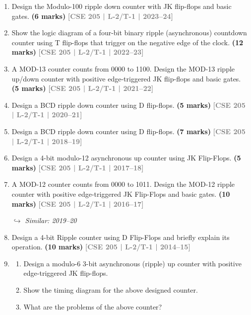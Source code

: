\documentclass[12pt,a3paper]{article}
\newcommand{\yr}[1]{\hfill\textcolor{gray}{\small\textbf{[#1]}}}
\newcommand{\mk}[1]{\textcolor{orange!70!black}{\small\textbf{(#1 marks)}}}
\newcommand{\variant}[1]{\par\vspace{1pt}\textcolor{blue!50!black}%
  {\footnotesize\textit{$\hookrightarrow$ Similar: #1}}}
\begin{document}
\begin{enumerate}

\item Design the Modulo-100 ripple down counter with JK flip-flops and basic gates.
\mk{6} \yr{CSE 205 | L-2/T-1 | 2023--24}

\item Show the logic diagram of a four-bit binary ripple (asynchronous) countdown counter using T flip-flops that trigger on the negative edge of the clock.
\mk{12} \yr{CSE 205 | L-2/T-1 | 2022--23}

\item A MOD-13 counter counts from 0000 to 1100. Design the MOD-13 ripple up/down counter with positive edge-triggered JK flip-flops and basic gates.
\mk{5} \yr{CSE 205 | L-2/T-1 | 2021--22}

\item Design a BCD ripple down counter using D flip-flops.
\mk{5} \yr{CSE 205 | L-2/T-1 | 2020--21}

\item Design a BCD ripple down counter using D flip-flops.
\mk{7} \yr{CSE 205 | L-2/T-1 | 2018--19}

\item Design a 4-bit modulo-12 asynchronous up counter using JK Flip-Flops.
\mk{5} \yr{CSE 205 | L-2/T-1 | 2017--18}


\item A MOD-12 counter counts from 0000 to 1011. Design the MOD-12 ripple counter with positive edge-triggered JK Flip-Flops and basic gates.
\mk{10} \yr{CSE 205 | L-2/T-1 | 2016--17}
\variant{2019--20}

\item Design a 4-bit Ripple counter using D Flip-Flops and briefly explain its operation.
\mk{10} \yr{CSE 205 | L-2/T-1 | 2014--15}


\item
\begin{enumerate}
  \item Design a modulo-6 3-bit asynchronous (ripple) up counter with positive edge-triggered JK flip-flops.
  \item Show the timing diagram for the above designed counter.
  \item What are the problems of the above counter?


\end{enumerate}
\end{enumerate}
\end{document}
